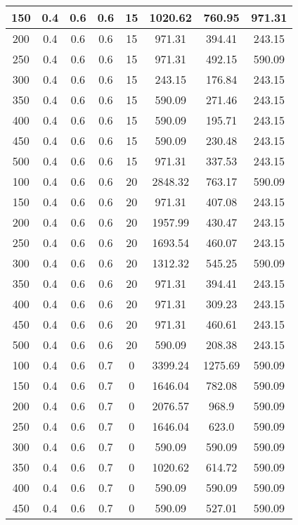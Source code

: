 \documentclass[a4paper, 12pt]{extreport}
\begin{document}
\begin{itemize}
\begin{longtable}{|c|c|c|c|c|c|c|c|}
			150 & 0.4 & 0.6 & 0.6 & 15 & 1020.62 & 760.95 & 971.31 \\\hline
			200 & 0.4 & 0.6 & 0.6 & 15 & 971.31 & 394.41 & 243.15 \\\hline
			250 & 0.4 & 0.6 & 0.6 & 15 & 971.31 & 492.15 & 590.09 \\\hline
			300 & 0.4 & 0.6 & 0.6 & 15 & 243.15 & 176.84 & 243.15 \\\hline
			350 & 0.4 & 0.6 & 0.6 & 15 & 590.09 & 271.46 & 243.15 \\\hline
			400 & 0.4 & 0.6 & 0.6 & 15 & 590.09 & 195.71 & 243.15 \\\hline
			450 & 0.4 & 0.6 & 0.6 & 15 & 590.09 & 230.48 & 243.15 \\\hline
			500 & 0.4 & 0.6 & 0.6 & 15 & 971.31 & 337.53 & 243.15 \\\hline
			100 & 0.4 & 0.6 & 0.6 & 20 & 2848.32 & 763.17 & 590.09 \\\hline
			150 & 0.4 & 0.6 & 0.6 & 20 & 971.31 & 407.08 & 243.15 \\\hline
			200 & 0.4 & 0.6 & 0.6 & 20 & 1957.99 & 430.47 & 243.15 \\\hline
			250 & 0.4 & 0.6 & 0.6 & 20 & 1693.54 & 460.07 & 243.15 \\\hline
			300 & 0.4 & 0.6 & 0.6 & 20 & 1312.32 & 545.25 & 590.09 \\\hline
			350 & 0.4 & 0.6 & 0.6 & 20 & 971.31 & 394.41 & 243.15 \\\hline
			400 & 0.4 & 0.6 & 0.6 & 20 & 971.31 & 309.23 & 243.15 \\\hline
			450 & 0.4 & 0.6 & 0.6 & 20 & 971.31 & 460.61 & 243.15 \\\hline
			500 & 0.4 & 0.6 & 0.6 & 20 & 590.09 & 208.38 & 243.15 \\\hline
			100 & 0.4 & 0.6 & 0.7 & 0 & 3399.24 & 1275.69 & 590.09 \\\hline
			150 & 0.4 & 0.6 & 0.7 & 0 & 1646.04 & 782.08 & 590.09 \\\hline
			200 & 0.4 & 0.6 & 0.7 & 0 & 2076.57 & 968.9 & 590.09 \\\hline
			250 & 0.4 & 0.6 & 0.7 & 0 & 1646.04 & 623.0 & 590.09 \\\hline
			300 & 0.4 & 0.6 & 0.7 & 0 & 590.09 & 590.09 & 590.09 \\\hline
			350 & 0.4 & 0.6 & 0.7 & 0 & 1020.62 & 614.72 & 590.09 \\\hline
			400 & 0.4 & 0.6 & 0.7 & 0 & 590.09 & 590.09 & 590.09 \\\hline
			450 & 0.4 & 0.6 & 0.7 & 0 & 590.09 & 527.01 & 590.09 \\\hline

\end{longtable}
\end{itemize}
\end{document}
